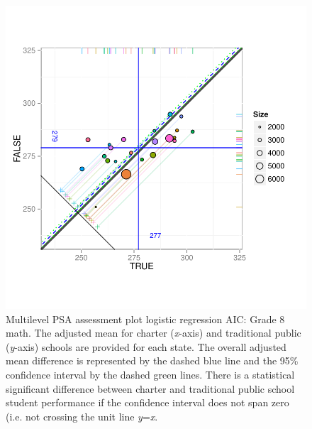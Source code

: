 \begin{figure}[h!]
\begin{center}
\includegraphics[width=\textwidth,trim=0 .6in 0 .6in]{../Figures2009/g8math-mlpsa-lrAIC-circ.pdf}
\caption[Multilevel PSA assessment plot logistic regression AIC: Grade 8 math]{Multilevel PSA assessment plot logistic regression AIC: Grade 8 math. The adjusted mean for charter (\textit{x}-axis) and traditional public (\textit{y}-axis) schools are provided for each state. The overall adjusted mean difference is represented by the dashed blue line and the 95\% confidence interval by the dashed green lines. There is a statistical significant difference between charter and traditional public school student performance if the confidence interval does not span zero (i.e. not crossing the unit line \textit{y}=\textit{x}.}
\end{center}
\end{figure}

